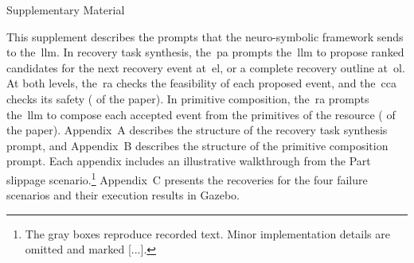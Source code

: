 \documentclass[preprint,12pt,authoryear]{elsarticle}
\begin{document}
\begin{center}
  {\Large\bfseries \papertitle\par}
  \medskip
  {\large Supplementary Material\par}
\end{center}


This supplement describes the prompts that the neuro-symbolic framework sends to the~\gls{llm}.  In recovery task synthesis, the~\gls{pa} prompts the~\gls{llm} to propose ranked candidates for the next recovery event at~\gls{el}, or a complete recovery outline at~\gls{ol}. At both levels, the~\gls{ra} checks the feasibility of each proposed event,
and the~\gls{cca} checks its safety (\FigOutline{} of the paper). In primitive composition, the~\gls{ra} prompts the~\gls{llm} to compose each accepted event from the primitives of the resource (\FigComposition{} of the paper). Appendix~A describes the structure of the recovery task synthesis prompt, and Appendix~B describes the structure of the primitive composition prompt. Each appendix includes an illustrative walkthrough from the Part slippage scenario.\footnote{The gray boxes reproduce recorded text. Minor implementation details are omitted and marked [...].} Appendix~C presents the recoveries for the four failure scenarios and their execution results in Gazebo.

\appendix
\renewcommand{\thesection}{Appendix~\Alph{section}}
\renewcommand{\thesubsection}{\Alph{section}.\arabic{subsection}}
\renewcommand{\thesubsubsection}{\thesubsection.\arabic{subsubsection}}
\makeatletter
{}
\makeatother
\renewcommand{\theHtable}{\Alph{section}.\arabic{table}}
\renewcommand{\theHfigure}{\Alph{section}.\arabic{figure}}
\renewcommand{\thepromptbox}{\Alph{section}.\arabic{promptbox}}
\renewcommand{\theHpromptbox}{\Alph{section}.\arabic{promptbox}}






\end{document}
